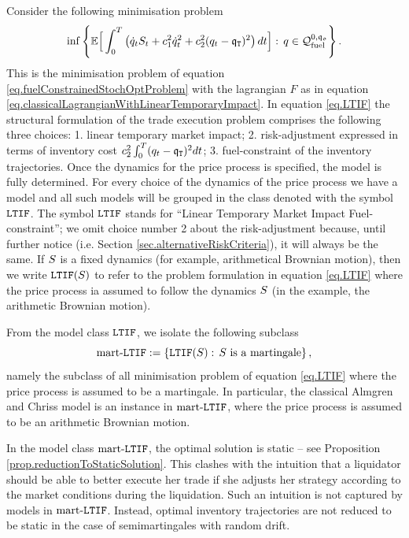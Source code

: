 \documentclass[10pt,a4paper]{article}
\begin{document}
	Consider the following minimisation problem 
	\begin{equation}\label{eq.LTIF}
	\inf \left\lbrace
	\mathbb{{E}}  \Big[ 
	\int_{0}^{T} 
	\left(
	\dot{q}_t S_t + c_{1}^{2} \dot{q}_{t}^{2} + c_{2} ^{2} (q_t - \mathfrak{q}_{\mathtt{T} })^{2} 
	\right) 
	  dt
	  \Big]
	  : \, q \in \mathcal{Q}_{\text{fuel}}^{0,\mathfrak{q_0}}
	\right\rbrace.
	\end{equation}
	This is the minimisation problem of equation \eqref{eq.fuelConstrainedStochOptProblem} with the lagrangian $F$ as in equation \eqref{eq.classicalLagrangianWithLinearTemporaryImpact}. In equation \eqref{eq.LTIF} the structural formulation of the trade execution problem comprises the following three choices: 1. linear temporary market impact; 2. risk-adjustment expressed in terms of inventory cost $c_{2} ^{2} \int_{0}^{T} (q_t - \mathfrak{q}_{\mathtt{T} }) ^{2} dt$; 3. fuel-constraint of the inventory trajectories. Once the dynamics for the price process is specified, the model is fully determined. For every choice of the dynamics of the price process we have a model and all such models will be grouped in the class denoted with the symbol $\mathtt{LTIF}$. The symbol $\mathtt{LTIF}$   stands for ``Linear Temporary Market Impact Fuel-constraint''; we omit choice number 2 about the risk-adjustment because, until further notice (i.e. Section \ref{sec.alternativeRiskCriteria}), it will always be the same.  If $S$ is a fixed dynamics (for example, arithmetical Brownian motion), then we write $\mathtt{LTIF}(S)$ to refer to the problem formulation in equation \eqref{eq.LTIF} where the price process ia assumed to follow the dynamics $S$ (in the example, the arithmetic Brownian motion).
	
	From the model class $\mathtt{LTIF}$, we isolate the following subclass 
	\begin{equation*}
	\text{mart-}\mathtt{LTIF}:=\left\lbrace
	\mathtt{LTIF}(S): \, S \text{  is a martingale}
	\right\rbrace,
	\end{equation*}
	namely the subclass of all minimisation problem of equation \eqref{eq.LTIF} where the price process is assumed to be a martingale. In particular, the classical Almgren and Chriss model is an instance in $\text{mart-}\mathtt{LTIF}$, where the price process is assumed to be an arithmetic Brownian motion. 
	
	In the model class $\text{mart-}\mathtt{LTIF}$, the optimal solution is static -- see Proposition \ref{prop.reductionToStaticSolution}. This clashes with the intuition that a liquidator should be able to better execute her trade if  she adjusts her strategy according to the market conditions during the liquidation. Such an intuition is not captured by models in $\text{mart-}\mathtt{LTIF}$. Instead, optimal inventory trajectories are not reduced to be static in the case of semimartingales with random drift. 
	
\end{document}
